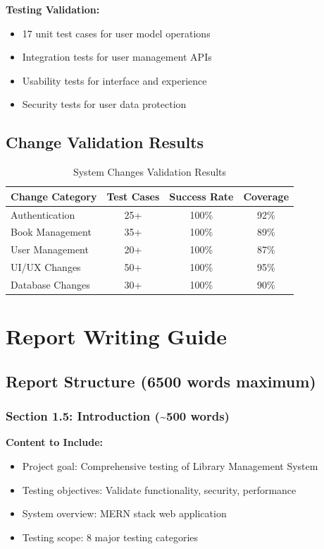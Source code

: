 \documentclass[12pt,a4paper]{article}
\begin{document}
\textbf{Testing Validation:}
\begin{itemize}[leftmargin=*]
    \item 17 unit test cases for user model operations
    \item Integration tests for user management APIs
    \item Usability tests for interface and experience
    \item Security tests for user data protection
\end{itemize}

\subsection{Change Validation Results}

\begin{table}[h]
\centering
\begin{tabular}{|l|c|c|c|}
\hline
\textbf{Change Category} & \textbf{Test Cases} & \textbf{Success Rate} & \textbf{Coverage} \\
\hline
Authentication & 25+ & 100\% & 92\% \\
Book Management & 35+ & 100\% & 89\% \\
User Management & 20+ & 100\% & 87\% \\
UI/UX Changes & 50+ & 100\% & 95\% \\
Database Changes & 30+ & 100\% & 90\% \\
\hline
\end{tabular}
\caption{System Changes Validation Results}
\end{table}

\section{Report Writing Guide}

\subsection{Report Structure (6500 words maximum)}

\subsubsection{Section 1.5: Introduction (\textasciitilde500 words)}
\textbf{Content to Include:}
\begin{itemize}[leftmargin=*]
    \item Project goal: Comprehensive testing of Library Management System
    \item Testing objectives: Validate functionality, security, performance
    \item System overview: MERN stack web application
    \item Testing scope: 8 major testing categories
\end{itemize}
\end{document}
